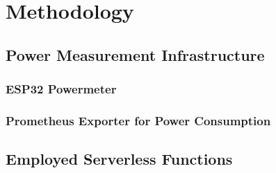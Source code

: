 \chapter{Methodology}\label{chapter:methodology}


\section{Power Measurement Infrastructure}
\subsection{ESP32 Powermeter}

\subsection{Prometheus Exporter for Power Consumption}


\section{Employed Serverless Functions}